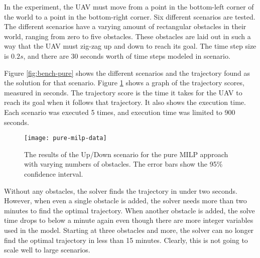 In the experiment, the UAV must move from a point in the bottom-left corner of the world to a point in the bottom-right corner. Six different scenarios are tested. The different scenarios have a varying amount of rectangular obstacles in their world, ranging from zero to five obstacles. These obstacles are laid out in such a way that the UAV must zig-zag up and down to reach its goal. The time step size is $0.2s$, and there are 30 seconds worth of time steps modeled in scenario. 
\par
Figure \ref{fig:bench-pure} shows the different scenarios and the trajectory found as the solution for that scenario. Figure \ref{fig:pure-data} shows a graph of the trajectory scores, measured in seconds. The trajectory score is the time it takes for the UAV to reach its goal when it follows that trajectory. It also shows the execution time. Each scenario was executed 5 times, and execution time was limited to 900 seconds.

\begin{figure}[t]
	\centering
	\texttt{[image: pure-milp-data]}
	\caption[The results for the pure MILP approach ]{The results of the Up/Down scenario for the pure MILP approach with varying numbers of obstacles. The error bars show the 95\% confidence interval.}
	\label{fig:pure-data}
\end{figure}

Without any obstacles, the solver finds the trajectory in under two seconds. However, when even a single obstacle is added, the solver needs more than two minutes to find the optimal trajectory. When another obstacle is added, the solve time drops to below a minute again even though there are more integer variables used in the model. Starting at three obstacles and more, the solver can no longer find the optimal trajectory in less than 15 minutes. Clearly, this is not going to scale well to large scenarios.
